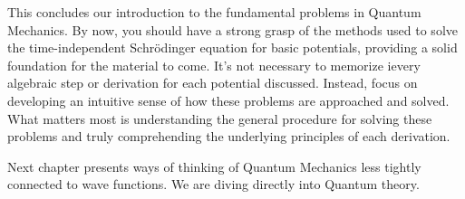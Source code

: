 This concludes our introduction to the fundamental problems in Quantum
Mechanics. By now, you should have a strong grasp of the methods used to solve
the time-independent Schrödinger equation for basic potentials, providing
a solid foundation for the material to come. It's not necessary to memorize
ievery algebraic step or derivation for each potential discussed. Instead, focus
on developing an intuitive sense of how these problems are approached and
solved. What matters most is understanding the general procedure for solving
these problems and truly comprehending the underlying principles of each
derivation. 

Next chapter presents ways of thinking of
Quantum Mechanics less tightly connected to wave functions. We are diving
directly into Quantum theory. 
